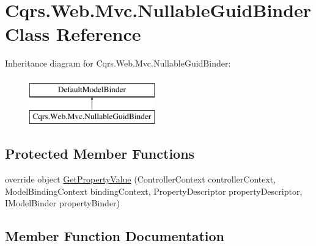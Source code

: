 \hypertarget{classCqrs_1_1Web_1_1Mvc_1_1NullableGuidBinder}{}\section{Cqrs.\+Web.\+Mvc.\+Nullable\+Guid\+Binder Class Reference}
\label{classCqrs_1_1Web_1_1Mvc_1_1NullableGuidBinder}
Inheritance diagram for Cqrs.\+Web.\+Mvc.\+Nullable\+Guid\+Binder\+:\begin{figure}[H]
\begin{center}
\leavevmode
\includegraphics[height=2.000000cm]{classCqrs_1_1Web_1_1Mvc_1_1NullableGuidBinder}
\end{center}
\end{figure}
\subsection*{Protected Member Functions}
\begin{DoxyCompactItemize}
\item 
override object \hyperlink{classCqrs_1_1Web_1_1Mvc_1_1NullableGuidBinder_ab6dc97f55bdf6a968449f365a807da0a_ab6dc97f55bdf6a968449f365a807da0a}{Get\+Property\+Value} (Controller\+Context controller\+Context, Model\+Binding\+Context binding\+Context, Property\+Descriptor property\+Descriptor, I\+Model\+Binder property\+Binder)
\end{DoxyCompactItemize}


\subsection{Member Function Documentation}
\mbox{\label{classCqrs_1_1Web_1_1Mvc_1_1NullableGuidBinder_ab6dc97f55bdf6a968449f365a807da0a_ab6dc97f55bdf6a968449f365a807da0a}} 

